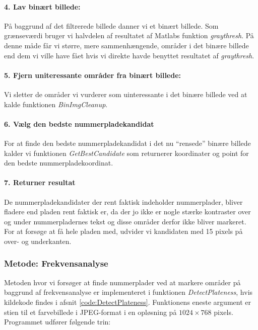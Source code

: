 \paragraph{4. Lav binært billede:}
På baggrund af det filtrerede billede danner vi et binært billede. Som grænseværdi bruger vi halvdelen af resultatet af Matlabs funktion \textit{graythresh}. På denne måde får vi større, mere sammenhængende, områder i det binære billede end dem vi ville have fået hvis vi direkte havde benyttet resultatet af \textit{graythresh}.

\paragraph{5. Fjern uniteressante områder fra binært billede:}
Vi sletter de områder vi vurderer som uinteressante i det binære billede ved at kalde funktionen \textit{BinImgCleanup}.

\paragraph{6. Vælg den bedste nummerpladekandidat}
For at finde den bedste nummerpladekandidat i det nu ``rensede'' binære billede kalder vi funktionen \textit{GetBestCandidate} som returnerer koordinater og point for den bedste nummerpladekoordinat.

\paragraph{7. Returner resultat}
De nummerpladekandidater der rent faktisk indeholder nummerplader, bliver fladere end pladen rent faktisk er, da der jo ikke er nogle stærke kontraster over og under nummerpladernes tekst og disse områder derfor ikke bliver markeret. For at forsøge at få hele pladen med, udvider vi kandidaten med 15 pixels på over- og underkanten. 

\subsubsection{Metode: Frekvensanalyse}
Metoden hvor vi forsøger at finde nummerplader ved at markere områder på baggrund af frekvensanalyse er implementeret i funktionen \textit{DetectPlateness}, hvis kildekode findes i afsnit \vref{code:DetectPlateness}. Funktionens eneste argument er stien til et farvebillede i JPEG-format i en opløsning på $1024 \times 768$ pixels. Programmet udfører følgende trin:

